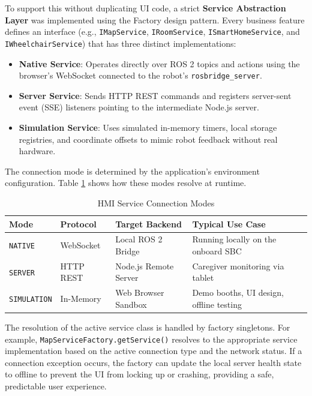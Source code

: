 To support this without duplicating UI code, a strict \textbf{Service Abstraction Layer} was implemented using the Factory design pattern. Every business feature defines an interface (e.g., \texttt{IMapService}, \texttt{IRoomService}, \texttt{ISmartHomeService}, and \texttt{IWheelchairService}) that has three distinct implementations:
\begin{itemize}
    \item \textbf{Native Service}: Operates directly over ROS 2 topics and actions using the browser's WebSocket connected to the robot's \texttt{rosbridge\_server}.
    \item \textbf{Server Service}: Sends HTTP REST commands and registers server-sent event (SSE) listeners pointing to the intermediate Node.js server.
    \item \textbf{Simulation Service}: Uses simulated in-memory timers, local storage registries, and coordinate offsets to mimic robot feedback without real hardware.
\end{itemize}

The connection mode is determined by the application's environment configuration. Table \ref{tab:connection-modes} shows how these modes resolve at runtime.

\begin{table}[H]
\centering
\caption{HMI Service Connection Modes}
\label{tab:connection-modes}
\begin{tabularx}{\textwidth}{|l|l|>{\raggedright\arraybackslash}X|>{\raggedright\arraybackslash}X|}
\hline
\textbf{Mode} & \textbf{Protocol} & \textbf{Target Backend} & \textbf{Typical Use Case} \\ \hline
\texttt{NATIVE} & WebSocket & Local ROS 2 Bridge & Running locally on the onboard SBC \\ \hline
\texttt{SERVER} & HTTP REST & Node.js Remote Server & Caregiver monitoring via tablet \\ \hline
\texttt{SIMULATION} & In-Memory & Web Browser Sandbox & Demo booths, UI design, offline testing \\ \hline
\end{tabularx}
\end{table}

The resolution of the active service class is handled by factory singletons. For example, \texttt{MapServiceFactory.getService()} resolves to the appropriate service implementation based on the active connection type and the network status. If a connection exception occurs, the factory can update the local server health state to offline to prevent the UI from locking up or crashing, providing a safe, predictable user experience.

